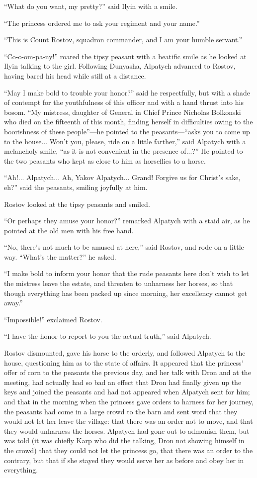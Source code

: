 ``What do you want, my pretty?'' said Ilyin with a smile.

``The princess ordered me to ask your regiment and your name.''

``This is Count Rostov, squadron commander, and I am your humble
servant.''

``Co-o-om-pa-ny!'' roared the tipsy peasant with a beatific smile
as he looked at Ilyin talking to the girl. Following Dunyasha,
Alpatych advanced to Rostov, having bared his head while still at
a distance.

``May I make bold to trouble your honor?'' said he respectfully,
but with a shade of contempt for the youthfulness of this officer
and with a hand thrust into his bosom. ``My mistress, daughter of
General in Chief Prince Nicholas Bolkonski who died on the
fifteenth of this month, finding herself in difficulties owing to
the boorishness of these people''---he pointed to the
peasants---``asks you to come up to the house... Won't you,
please, ride on a little farther,'' said Alpatych with a
melancholy smile, ``as it is not convenient in the presence
of...?'' He pointed to the two peasants who kept as close to him
as horseflies to a horse.

``Ah!... Alpatych... Ah, Yakov Alpatych... Grand! Forgive us for
Christ's sake, eh?'' said the peasants, smiling joyfully at him.

Rostov looked at the tipsy peasants and smiled.

``Or perhaps they amuse your honor?'' remarked Alpatych with a
staid air, as he pointed at the old men with his free hand.

``No, there's not much to be amused at here,'' said Rostov, and
rode on a little way. ``What's the matter?'' he asked.

``I make bold to inform your honor that the rude peasants here
don't wish to let the mistress leave the estate, and threaten to
unharness her horses, so that though everything has been packed
up since morning, her excellency cannot get away.''

``Impossible!'' exclaimed Rostov.

``I have the honor to report to you the actual truth,'' said
Alpatych.

Rostov dismounted, gave his horse to the orderly, and followed
Alpatych to the house, questioning him as to the state of
affairs. It appeared that the princess' offer of corn to the
peasants the previous day, and her talk with Dron and at the
meeting, had actually had so bad an effect that Dron had finally
given up the keys and joined the peasants and had not appeared
when Alpatych sent for him; and that in the morning when the
princess gave orders to harness for her journey, the peasants had
come in a large crowd to the barn and sent word that they would
not let her leave the village: that there was an order not to
move, and that they would unharness the horses. Alpatych had gone
out to admonish them, but was told (it was chiefly Karp who did
the talking, Dron not showing himself in the crowd) that they
could not let the princess go, that there was an order to the
contrary, but that if she stayed they would serve her as before
and obey her in everything.

